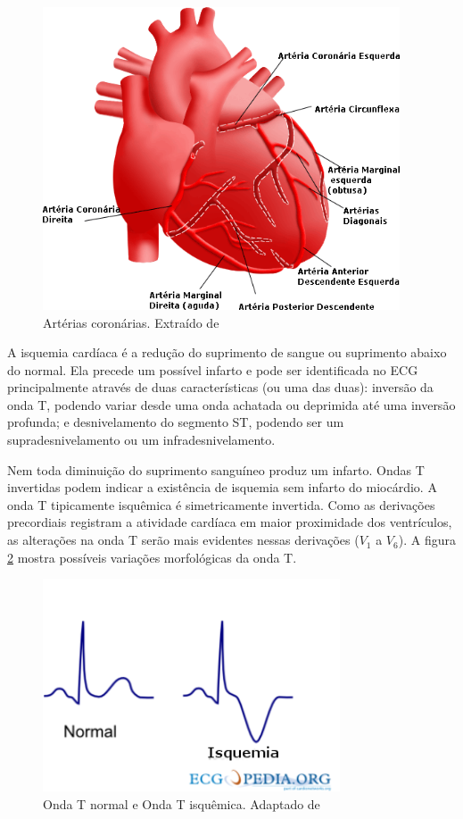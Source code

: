 \begin{figure}[ht!]
 \centering
 \includegraphics[width=300pt]{figures/chap2-arteries.png}
 \caption[Artérias coronárias]{Artérias coronárias. Extraído de \cite{yale}}
 \label{fig:arteries}
\end{figure}

A isquemia cardíaca é a redução do suprimento de sangue ou suprimento abaixo do normal. Ela precede um possível infarto e pode ser identificada no ECG principalmente através de duas características (ou uma das duas): inversão da onda T, podendo variar desde uma onda achatada ou deprimida até uma inversão profunda; e desnivelamento do segmento ST, podendo ser um supradesnivelamento ou um infradesnivelamento.

Nem toda diminuição do suprimento sanguíneo produz um infarto. Ondas T invertidas podem indicar a existência de isquemia sem infarto do miocárdio.  A onda T tipicamente isquêmica é simetricamente invertida. Como as derivações precordiais registram a atividade cardíaca em maior proximidade dos ventrículos, as alterações na onda T serão mais evidentes nessas derivações ($V_1$ a $V_6$). A figura \ref{fig:twave} mostra possíveis variações morfológicas da onda T.

\begin{figure}[ht!]
 \centering
 \includegraphics[width=250pt]{figures/chap2-twave.png}
 \caption[Onda T normal e Onda T isquêmica]{Onda T normal e Onda T isquêmica. Adaptado de \cite{VanDerBilt}}
 \label{fig:twave}
\end{figure}

